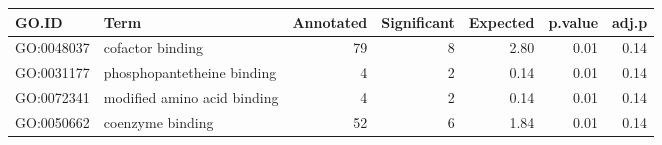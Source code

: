 \begin{table}[ht]
\centering
\begin{tabular}{llrrrrr}
  \hline
GO.ID & Term & Annotated & Significant & Expected & p.value & adj.p \\ 
  \hline
GO:0048037 & cofactor binding &  79 &   8 & 2.80 & 0.01 & 0.14 \\ 
  GO:0031177 & phosphopantetheine binding &   4 &   2 & 0.14 & 0.01 & 0.14 \\ 
  GO:0072341 & modified amino acid binding &   4 &   2 & 0.14 & 0.01 & 0.14 \\ 
  GO:0050662 & coenzyme binding &  52 &   6 & 1.84 & 0.01 & 0.14 \\ 
   \hline
\end{tabular}
\end{table}
